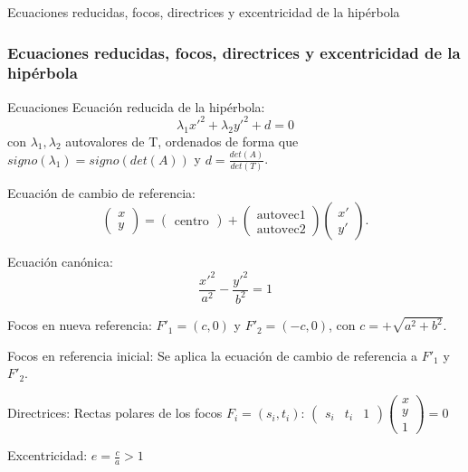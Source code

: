 \documentclass[xcolor={dvipsnames},aspectratio=169,10pt]{beamer}
\begin{document}
\begin{frame}{Ecuaciones reducidas, focos, directrices y excentricidad de la hipérbola}
  \frametitle{Ecuaciones reducidas, focos, directrices y excentricidad de la hipérbola}
  \begin{block}{Ecuaciones}
    Ecuación reducida de la hipérbola:
    \[\lambda_1x'^2 + \lambda_2y'^2 + d = 0\]
    con $\lambda_1, \lambda_2$ autovalores de T, ordenados de forma que $signo(\lambda_1) = signo(det(A))$ y $d = \frac{det(A)}{det(T)}$.
    
    Ecuación de cambio de referencia:
    \[\begin{pmatrix} x \\ y \end{pmatrix} = \begin{pmatrix} \text{centro} \end{pmatrix} + \begin{pmatrix} \text{autovec1} \\ \text{autovec2} \end{pmatrix} \begin{pmatrix} x' \\ y' \end{pmatrix}.\]
    
    Ecuación canónica:
    \[\frac{x'^2}{a^2} - \frac{y'^2}{b^2} = 1\]
    
    Focos en nueva referencia: $F'_1 = (c, 0)$ y $F'_2 = (-c, 0)$, con $c = +\sqrt{a^2 + b^2}$.
    
    Focos en referencia inicial: Se aplica la ecuación de cambio de referencia a $F'_1$ y $F'_2$.
    
    Directrices: Rectas polares de los focos $F_i = (s_i, t_i)$: $\begin{pmatrix} s_i & t_i & 1 \end{pmatrix} \begin{pmatrix} x \\ y \\ 1 \end{pmatrix} = 0$
    
    Excentricidad: $e = \frac{c}{a} > 1$
  \end{block}
\end{frame}
\end{document}
